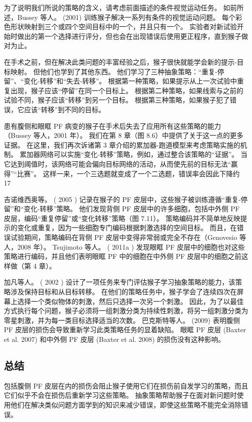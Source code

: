 为了说明我们所说的策略的含义，请考虑前面描述的条件视觉运动任务。 
如前所述，Bussey 等人。 (2001) 训练猴子解决一系列有条件的视觉运动问题。 
每个彩色形状映射到三个或四个空间目标中的一个，并且只有一个。 
实验者对新试验开始时做出的第一个选择进行评分，但也会在出现错误后使用更正程序，直到猴子做对为止。
\par 
 在手术之前，但在解决此类问题的丰富经验之后，猴子很快就能学会新的提示-目标映射。 
 但他们也学到了其他东西。 他们学习了三种抽象策略：“重复-停留”、“变化-转移”和“失去-转移”。 
 根据第一种策略，如果提示从上一次试验中重复出现，猴子应该“停留”在同一个目标上。 
 根据第二种策略，如果线索与之前的试验不同，猴子应该“转移”到另一个目标。 
 根据第三种策略，如果猴子犯了错误，它应该“转移”到不同的目标。	
\par 
患有腹侧和眼眶 PF 病变的猴子在手术后失去了应用所有这些策略的能力（Bussey 等人，2001 年）。 
我们在第 8 章（图 8.6）中提供了关于这一点的更多证据。 
在这里，我们再次诉诸第 3 章介绍的累加器-跑道模型来考虑策略实施的机制。 
累加器网络可以实施“变化-转移”策略，例如，通过整合该策略的“证据”。 当它达到阈值时，该网络可能会偏向目标网络的活动，从而使先前的目标无法“赢得”“比赛”。 
这样一来，一个三选题就变成了一个二选题，错误率会因此下降约 17%
\par 
吉诺维西奥等。 ( 2005 ) 记录在猴子的 PF 皮层中，这些猴子被训练遵循“重复-停留”和“变化-转移”策略。 
他们发现背侧 PF 皮层中的许多细胞，包括中外侧 PF 皮层，编码“重复停留”或“变化转移”策略（图 7.11）。 
策略编码并不简单地反映提示的变化或重复，因为一些细胞专门编码根据刺激选择的空间目标。 
而且，在错误试验期间，策略编码在背侧 PF 皮层中变得非常弱或完全不存在（Genovesio 等人，2008 年）。 
Tsujimoto 等人。 ( 2011a ) 发现眼眶 PF 皮层中的细胞也对这些策略进行编码，并且他们表明眼眶 PF 中的细胞在中外侧 PF 皮层中的细胞之前这样做（第 4 章）。
\par 
加凡等人。 ( 2002 ) 设计了一项任务来专门评估猴子学习抽象策略的能力，该策略涉及保持目标和从目标转移。 
在他们的策略任务中，猴子学会了连续四次在屏幕上选择一个类似物体的刺激，然后只选择一次另一个刺激。 
因此，为了以最佳方式执行每个问题，猴子必须将一组刺激分类为持续性刺激，将另一组刺激分类为零星刺激，并为每一类目标选择适当的次数。 
巴克斯特等人。 (2009) 表明腹侧 PF 皮层的损伤会导致重新学习此类策略任务的显着缺陷。 
眼眶 PF 皮层 (Baxter et al. 2007) 和中外侧 PF 皮层 (Baxter et al. 2008) 的损伤没有这种影响。
\subsection{总结}
\par 
包括腹侧 PF 皮层在内的损伤会阻止猴子使用它们在损伤前自发学习的策略，而且它们似乎不会在损伤后重新学习这些策略。 
抽象策略帮助猴子在面对新问题时使用他们在解决类似问题方面学到的知识来减少错误，即使这些策略不能完全消除错误。
